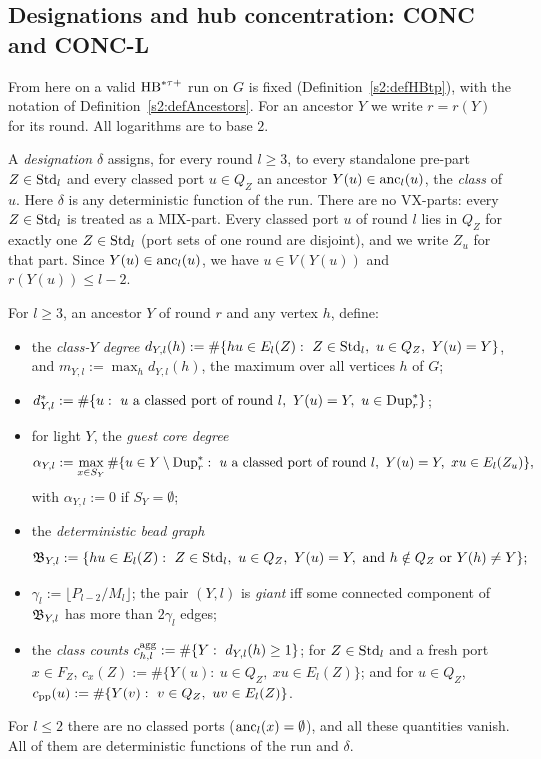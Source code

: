 \subsection{Designations and hub concentration: CONC and CONC-L}

From here on a valid $\mathrm{HB}^{*\tau{+}}$ run on $G$ is fixed (Definition~\ref{s2:defHBtp}), with the notation of Definition~\ref{s2:defAncestors}. For an ancestor $Y$ we write $r=r(Y)$ for its round. All logarithms are to base $2$.

\begin{definition}[designation and class data; $\mathcal V=\emptyset$]\label{s6:defDesign}
A \emph{designation} $\delta$ assigns, for every round $l\ge3$, to every standalone pre-part $Z\in\mathrm{Std}_l$ and every classed port $u\in Q_Z$ an ancestor $Y(u)\in\mathrm{anc}_l(u)$, the \emph{class} of $u$. Here $\delta$ is any deterministic function of the run. There are no VX-parts: every $Z\in\mathrm{Std}_l$ is treated as a MIX-part. Every classed port $u$ of round $l$ lies in $Q_Z$ for exactly one $Z\in\mathrm{Std}_l$ (port sets of one round are disjoint), and we write $Z_u$ for that part. Since $Y(u)\in\mathrm{anc}_l(u)$, we have $u\in V(Y(u))$ and $r(Y(u))\le l-2$.

For $l\ge3$, an ancestor $Y$ of round $r$ and any vertex $h$, define:
\begin{itemize}
\item the \emph{class-$Y$ degree} $d_{Y,l}(h):=\#\{hu\in E_l(Z):\ Z\in\Std_l,\ u\in Q_Z,\ Y(u)=Y\}$, and $m_{Y,l}:=\max_hd_{Y,l}(h)$, the maximum over all vertices $h$ of $G$;
\item $d^*_{Y,l}:=\#\{u:\ u\text{ a classed port of round }l,\ Y(u)=Y,\ u\in\mathrm{Dup}^{*}_{r}\}$;
\item for light $Y$, the \emph{guest core degree}
\[
\alpha_{Y,l}:=\max_{x\in S_Y}\#\{u\in Y\setminus\mathrm{Dup}^{*}_r:\ u\text{ a classed port of round }l,\ Y(u)=Y,\ xu\in E_l(Z_u)\},
\]
with $\alpha_{Y,l}:=0$ if $S_Y=\emptyset$;
\item the \emph{deterministic bead graph}
\[
\mathfrak{B}_{Y,l}:=\{hu\in E_l(Z):\ Z\in\mathrm{Std}_l,\ u\in Q_Z,\ Y(u)=Y,\ \text{and }h\notin Q_Z\text{ or }Y(h)\neq Y\};
\]
\item $\gamma_l:=\lfloor P_{l-2}/M_l\rfloor$; the pair $(Y,l)$ is \emph{giant} iff some connected component of $\mathfrak{B}_{Y,l}$ has more than $2\gamma_l$ edges;
\item the \emph{class counts} $c^{\mathrm{agg}}_{h,l}:=\#\{Y:\ d_{Y,l}(h)\ge1\}$; for $Z\in\mathrm{Std}_l$ and a fresh port $x\in F_Z$, $c_x(Z):=\#\{Y(u):\ u\in Q_Z,\ xu\in E_l(Z)\}$; and for $u\in Q_Z$, $c_{\mathrm{pp}}(u):=\#\{Y(v):\ v\in Q_Z,\ uv\in E_l(Z)\}$.
\end{itemize}
For $l\le2$ there are no classed ports ($\mathrm{anc}_l(x)=\emptyset$), and all these quantities vanish. All of them are deterministic functions of the run and $\delta$.
\deps{\ref{s2:defAncestors}, \ref{s2:defHBtp}}
\end{definition}

